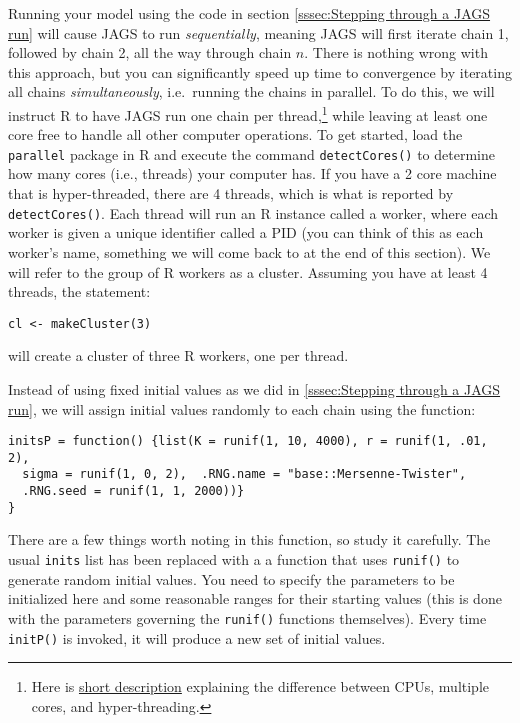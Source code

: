 \documentclass[12pt,english]{article}
\begin{document}
Running your model using the code in section \ref{sssec:Stepping through a JAGS run} will cause JAGS to run \emph{sequentially}, meaning JAGS will first iterate chain 1, followed by chain 2, all the way through chain $n$. There is nothing wrong with this approach, but you can significantly speed up time to convergence by iterating all chains \emph{simultaneously}, i.e.\ running the chains in parallel. To do this, we will instruct R to have JAGS run one chain per thread,\footnote{Here is \href{http://www.howtogeek.com/194756/cpu-basics-multiple-cpus-cores-and-hyper-threading-explained/}{short description} explaining the difference between CPUs, multiple cores, and hyper-threading.} while leaving at least one core free to handle all other computer operations. To get started, load the \texttt{parallel} package in R and execute the command \texttt{detectCores()} to determine how many cores (i.e., threads) your computer has. If you have a 2 core machine that is hyper-threaded, there are 4 threads, which is what is reported by \texttt{detectCores()}. Each thread will run an R instance called a worker, where each worker is given a unique identifier called a PID (you can think of this as each worker's name, something we will come back to at the end of this section). We will refer to the group of R workers as a cluster. Assuming you have at least 4 threads, the statement:

\begin{Verbatim}
cl <- makeCluster(3)
\end{Verbatim}

\noindent will create a cluster of three R workers, one per thread. 

Instead of using fixed initial values as we did in \ref{sssec:Stepping through a JAGS run}, we will assign initial values randomly to each chain using the function:

\begin{Verbatim}
initsP = function() {list(K = runif(1, 10, 4000), r = runif(1, .01, 2), 
  sigma = runif(1, 0, 2),  .RNG.name = "base::Mersenne-Twister", 
  .RNG.seed = runif(1, 1, 2000))}
}\end{Verbatim}

\noindent There are a few things worth noting in this function, so study it carefully. The usual \texttt{inits} list has been replaced with a a function that uses \texttt{runif()} to generate random initial values. You need to specify the parameters to be initialized here and some reasonable ranges for their starting values (this is done with the parameters governing the \texttt{runif()} functions themselves). Every time \texttt{initP()} is invoked, it will produce a new set of initial values. 
\end{document}
